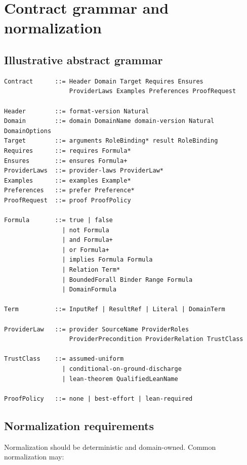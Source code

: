 \documentclass[11pt,oneside]{report}
\begin{document}
\chapter{Contract grammar and normalization}
\label{app:grammar}

\section{Illustrative abstract grammar}

\begin{lstlisting}[language={},caption={Illustrative contract grammar, independent of concrete JSON syntax.}]
Contract      ::= Header Domain Target Requires Ensures
                  ProviderLaws Examples Preferences ProofRequest

Header        ::= format-version Natural
Domain        ::= domain DomainName domain-version Natural DomainOptions
Target        ::= arguments RoleBinding* result RoleBinding
Requires      ::= requires Formula*
Ensures       ::= ensures Formula+
ProviderLaws  ::= provider-laws ProviderLaw*
Examples      ::= examples Example*
Preferences   ::= prefer Preference*
ProofRequest  ::= proof ProofPolicy

Formula       ::= true | false
                | not Formula
                | and Formula+
                | or Formula+
                | implies Formula Formula
                | Relation Term*
                | BoundedForall Binder Range Formula
                | DomainFormula

Term          ::= InputRef | ResultRef | Literal | DomainTerm

ProviderLaw   ::= provider SourceName ProviderRoles
                  ProviderPrecondition ProviderRelation TrustClass

TrustClass    ::= assumed-uniform
                | conditional-on-ground-discharge
                | lean-theorem QualifiedLeanName

ProofPolicy   ::= none | best-effort | lean-required
\end{lstlisting}

\section{Normalization requirements}

Normalization should be deterministic and domain-owned. Common normalization may:
\end{document}
